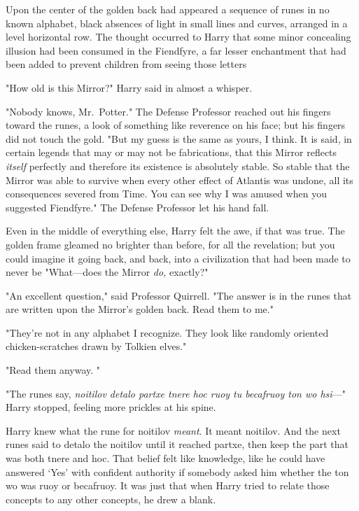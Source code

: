 Upon the center of the golden back had appeared a sequence of runes in no known
alphabet, black absences of light in small lines and curves, arranged in a
level horizontal row. The thought occurred to Harry that some minor concealing
illusion had been consumed in the Fiendfyre, a far lesser enchantment that had
been added to prevent children from seeing those letters{\el}

"How old is this Mirror?" Harry said in almost a whisper.

"Nobody knows, Mr.~Potter." The Defense Professor reached out his fingers
toward the runes, a look of something like reverence on his face; but his
fingers did not touch the gold. "But my guess is the same as yours, I think. It
is said, in certain legends that may or may not be fabrications, that this
Mirror reflects \emph{itself} perfectly and therefore its existence is
absolutely stable. So stable that the Mirror was able to survive when every
other effect of Atlantis was undone, all its consequences severed from Time.
You can see why I was amused when you suggested Fiendfyre." The Defense
Professor let his hand fall.

Even in the middle of everything else, Harry felt the awe, if that was true.
The golden frame gleamed no brighter than before, for all the revelation; but
you could imagine it going back, and back, into a civilization that had been
made to never be{\el} "What---does the Mirror \emph{do,} exactly?"

"An excellent question," said Professor Quirrell. "The answer is in the runes
that are written upon the Mirror's golden back. Read them to me."

"They're not in any alphabet I recognize. They look like randomly oriented
chicken-scratches drawn by Tolkien elves."

"Read them anyway. "

"The runes say, \emph{noitilov detalo partxe tnere hoc ruoy tu becafruoy ton wo
hsi}---" Harry stopped, feeling more prickles at his spine.

Harry knew what the rune for noitilov \emph{meant}. It meant noitilov. And the
next runes said to detalo the noitilov until it reached partxe, then keep the
part that was both tnere and hoc. That belief felt like knowledge, like he could
have answered `Yes' with confident authority if somebody asked him
whether the ton wo was ruoy or becafruoy. It was just that when Harry tried to
relate those concepts to any other concepts, he drew a blank.

